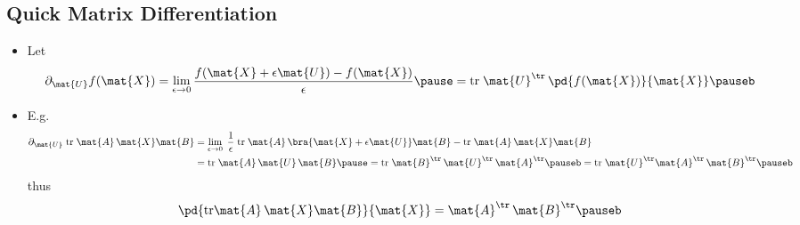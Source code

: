 \begin{slide}
\section[-2]{Quick Matrix Differentiation}

\begin{PauseHighLight}
  \begin{itemize}
  \item Let
    \begin{align*}
      \partial_{\mat{U}} f(\mat{X}) = \lim_{\epsilon\rightarrow0}
      \frac{f(\mat{X}+\epsilon \mat{U}) - f(\mat{X})}{\epsilon}\pause
      = \mathrm{tr}\;  \mat{U}^\tr \,  \pd{f(\mat{X})}{\mat{X}}\pauseb
    \end{align*}
  \item E.g.
    \begin{align*}
      \partial_{\mat{U}} \; \mathrm{tr}\; \mat{A} \, \mat{X} \mat{B}
      &=  \lim_{\epsilon\rightarrow0} \; \frac{1}{\epsilon} \; \mathrm{tr}\;
        \mat{A} \, \bra{\strut \mat{X} + \epsilon \mat{U}} \mat{B} -
        \mathrm{tr}\; \mat{A} \, \mat{X} \mat{B} \\
      &= \mathrm{tr}\; \mat{A} \, \mat{U} \, \mat{B}\pause
      = \mathrm{tr} \;\mat{B}^\tr \, \mat{U}^\tr \, \mat{A}^\tr\pauseb
      = \mathrm{tr} \; \mat{U}^\tr \mat{A}^\tr\, \mat{B}^\tr \pauseb
    \end{align*}
    thus
    \begin{align*}
      \pd{ \mathrm{tr} \mat{A} \, \mat{X} \mat{B} }{\mat{X}} =  \mat{A}^\tr\, \mat{B}^\tr \pauseb
    \end{align*}
  \end{itemize}
\end{PauseHighLight}

\end{slide}


